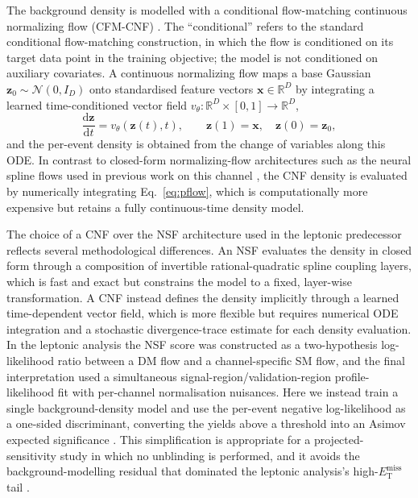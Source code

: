 \documentclass[11pt,a4paper,twocolumn]{article}
\newcommand{\MET}{\ensuremath{E_{\mathrm{T}}^{\mathrm{miss}}}}
\begin{document}
The background density is modelled with a conditional flow-matching
continuous normalizing flow (CFM-CNF) \cite{lipman_flow_matching}. The
``conditional'' refers to the standard conditional flow-matching
construction, in which the flow is conditioned on its target data point in
the training objective; the model is not conditioned on auxiliary
covariates. A continuous normalizing flow \cite{chen_neural_ode,
papamakarios_flows} maps a base Gaussian $\mathbf{z}_0 \sim
\mathcal{N}(0, I_D)$ onto standardised feature vectors $\mathbf{x}\in
\mathbb{R}^D$ by integrating a learned time-conditioned vector field
$v_\theta: \mathbb{R}^D\times[0,1]\to\mathbb{R}^D$,
\begin{equation}
  \frac{\mathrm{d}\mathbf{z}}{\mathrm{d}t}
  = v_\theta\!\left(\mathbf{z}(t), t\right), \qquad
  \mathbf{z}(1)=\mathbf{x}, \quad \mathbf{z}(0)=\mathbf{z}_0,
  \label{eq:pflow}
\end{equation}
and the per-event density is obtained from the change of variables along
this ODE. In contrast to closed-form normalizing-flow architectures such as
the neural spline flows used in previous work on this channel
\cite{durkan_nsf,rasineni_nsf_monoz}, the CNF density is evaluated by
numerically integrating Eq.~\eqref{eq:pflow}, which is computationally more
expensive but retains a fully continuous-time density model.

The choice of a CNF over the NSF architecture used in the leptonic
predecessor \cite{rasineni_nsf_monoz} reflects several methodological
differences. An NSF evaluates the density in closed form through a
composition of invertible rational-quadratic spline coupling layers, which
is fast and exact but constrains the model to a fixed, layer-wise
transformation. A CNF instead defines the density implicitly through a
learned time-dependent vector field, which is more flexible but requires
numerical ODE integration and a stochastic divergence-trace estimate for
each density evaluation. In the leptonic analysis the NSF score was
constructed as a two-hypothesis log-likelihood ratio between a DM flow and
a channel-specific SM flow, and the final interpretation used a
simultaneous signal-region/validation-region profile-likelihood fit with
per-channel normalisation nuisances. Here we instead train a single
background-density model and use the per-event negative log-likelihood as a
one-sided discriminant, converting the yields above a threshold into an
Asimov expected significance \cite{cowan_asymptotic}. This simplification
is appropriate for a projected-sensitivity study in which no unblinding is
performed, and it avoids the background-modelling residual that dominated
the leptonic analysis's high-\MET{} tail \cite{rasineni_nsf_monoz}.
\end{document}
